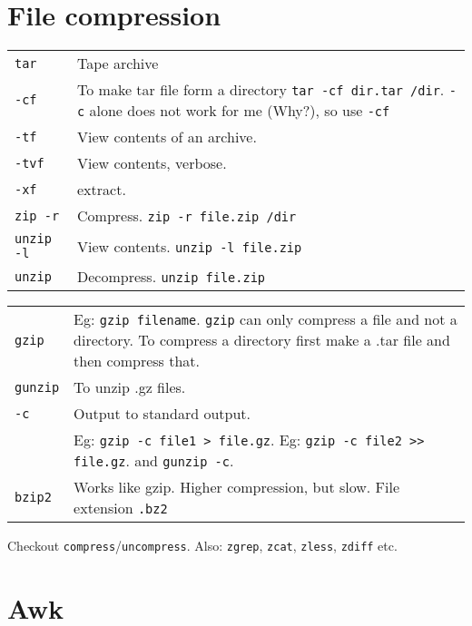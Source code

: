 \section{File compression}

\begin{tabularx}{\linewidth}{lX}

\hline
\texttt{tar} & Tape archive\\
\texttt{-cf} & To make tar file form a directory \texttt{tar -cf dir.tar /dir}. \texttt{-c} alone does not work for me (Why?), so use \texttt{-cf}\\
\texttt{-tf} & View contents of an archive.\\
\texttt{-tvf} & View contents, verbose.\\
\texttt{-xf} & extract.\\
\hline

\texttt{zip -r} & Compress. \texttt{zip -r file.zip /dir}\\
\texttt{unzip -l}  & View contents. \texttt{unzip -l file.zip}\\
\texttt{unzip} & Decompress. \texttt{unzip file.zip}\\
\hline

\end{tabularx}

\begin{tabularx}{\linewidth}{lX}
\hline
\texttt{gzip} & Eg: \texttt{gzip filename}. \texttt{gzip} can only compress a file and not a directory. To compress a directory first make a .tar file and then compress that.\\
\texttt{gunzip} & To unzip .gz files.\\
\texttt{-c} & Output to standard output. \\
& Eg: \texttt{gzip -c file1 >  file.gz}. Eg: \texttt{gzip -c file2 >> file.gz}. and \texttt{gunzip -c}.\\
\texttt{bzip2} & Works like gzip. Higher compression, but slow. File extension \texttt{.bz2}\\
\hline

\end{tabularx}

Checkout \texttt{compress}/\texttt{uncompress}. Also: \texttt{zgrep}, \texttt{zcat}, \texttt{zless}, \texttt{zdiff} etc.



\section{Awk}

